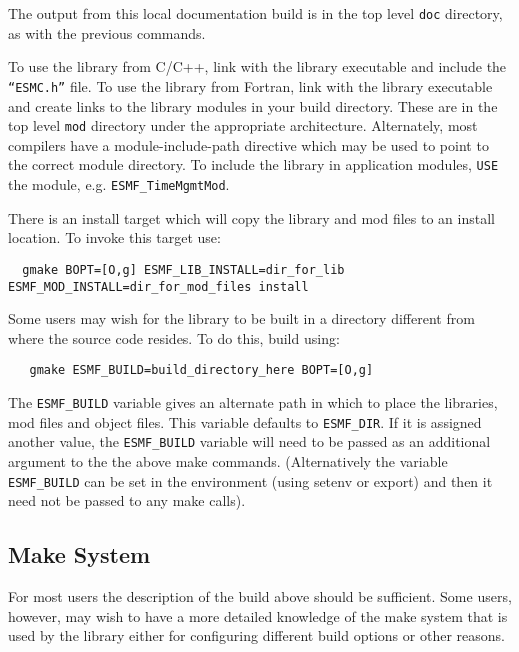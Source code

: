 \noindent The output from this local documentation build is in the top level {\tt doc}
directory, as with the previous commands.

\smallskip

To use the library from C/C++, link with the library executable and include
the {\tt ``ESMC.h''} file.
To use the library from Fortran, link with the library executable and
create links to the library modules in your build directory.  These are
in the top level {\tt mod} directory under the appropriate architecture.  Alternately, 
most compilers have a module-include-path directive which may be used to point
to the correct module directory.
To include the library in application modules, {\tt USE} the
module, e.g. {\tt ESMF\_TimeMgmtMod}.  

There is an install target which will copy the library and mod files to an
install location.  To invoke this target use:
\begin{verbatim}
  gmake BOPT=[O,g] ESMF_LIB_INSTALL=dir_for_lib ESMF_MOD_INSTALL=dir_for_mod_files install 
\end{verbatim}

Some users may wish for the library to be built in a directory different from 
where the source code resides.  To do this, build using:
\begin{verbatim}
   gmake ESMF_BUILD=build_directory_here BOPT=[O,g]
\end{verbatim}

The {\tt ESMF\_BUILD} variable gives an alternate path in which to place the libraries,
mod files and object files.  This variable defaults to {\tt ESMF\_DIR}.  If it is 
assigned another value, the {\tt ESMF\_BUILD} variable will need to be passed as
an additional argument to the the above make commands.  (Alternatively the variable
{\tt ESMF\_BUILD} can be set in the environment (using setenv or export) and then it 
need not be passed to any make calls).

\subsection{Make System}
For most users the description of the build above should be sufficient.  Some
users, however, may wish to have a more detailed knowledge of the make system
that is used by the library either for configuring different build options or
other reasons.
